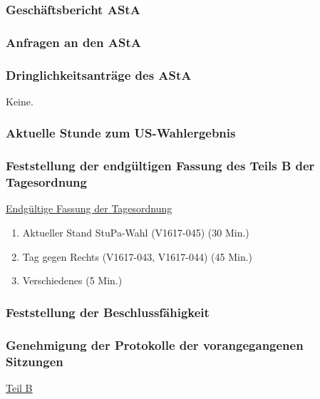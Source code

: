 \documentclass[ngerman,headheight=70pt]{scrartcl}
\begin{document}
    \subsubsection{Geschäftsbericht AStA}



    \subsubsection{Anfragen an den AStA}



    \subsubsection{Dringlichkeitsanträge des AStA}

    Keine.

    \subsubsection{Aktuelle Stunde zum US-Wahlergebnis}

    \subsubsection{Feststellung der endgültigen Fassung des Teils B der Tagesordnung}


    \newpage
    \underline{Endgültige Fassung der Tagesordnung}
    \begin{enumerate}[label={\textbf{Top \theenumi}},leftmargin=*]
        \item Aktueller Stand StuPa-Wahl (V1617-045) (30 Min.)
        \item Tag gegen Rechts (V1617-043, V1617-044) (45 Min.)
        \item Verschiedenes (5 Min.)
    \end{enumerate}

    \subsubsection{Feststellung der Beschlussfähigkeit}


    \subsubsection{Genehmigung der Protokolle der vorangegangenen Sitzungen}

    \vspace{0.5cm}
    {\Large \underline{Teil B}}
\end{document}
